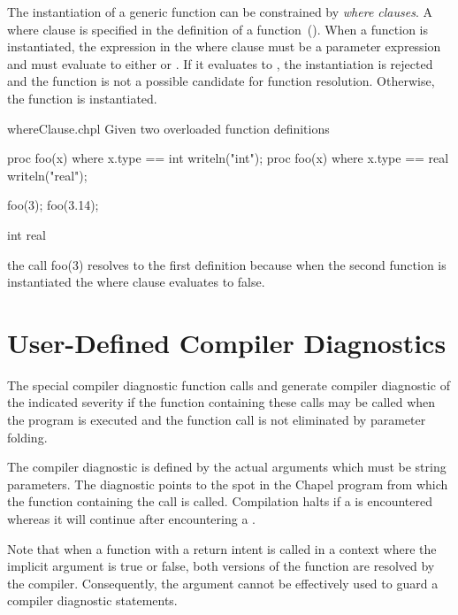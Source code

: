 The instantiation of a generic function can be constrained by {\em
where clauses}.  A where clause is specified in the definition of a
function~().  When a function is
instantiated, the expression in the where clause must be a parameter
expression and must evaluate to either  or .
If it evaluates to , the instantiation is rejected and the
function is not a possible candidate for function resolution.
Otherwise, the function is instantiated.
\begin{chapelexample}{whereClause.chpl}
Given two overloaded function definitions
\begin{chapel}
proc foo(x) where x.type == int { writeln("int"); }
proc foo(x) where x.type == real { writeln("real"); }
\end{chapel}
\begin{chapelpost}
foo(3);
foo(3.14);
\end{chapelpost}
\begin{chapeloutput}
int
real
\end{chapeloutput}
the call foo(3) resolves to the first definition because when the
second function is instantiated the where clause evaluates to false.
\end{chapelexample}

\section{User-Defined Compiler Diagnostics}
\label{User_Defined_Compiler_Errors}

The special compiler diagnostic function calls 
and  generate compiler diagnostic of the
indicated severity if the function containing these calls may be
called when the program is executed and the function call is not
eliminated by parameter folding.

The compiler diagnostic is defined by the actual arguments which must
be string parameters.  The diagnostic points to the spot in the Chapel
program from which the function containing the call is called.
Compilation halts if a  is encountered whereas it
will continue after encountering a .

\begin{craychapel}
Note that when a function with a  return intent is called in a
context where the implicit  argument is true or false, both
versions of the function are resolved by the compiler.  Consequently, the
 argument cannot be effectively used to guard a compiler
diagnostic statements.
\end{craychapel}

